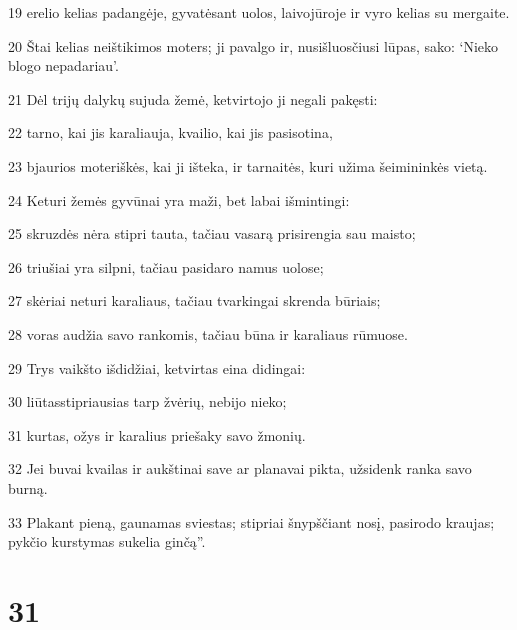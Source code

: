 \par 19 erelio kelias padangėje, gyvatės­ant uolos, laivo­jūroje ir vyro kelias su mergaite. 
\par 20 Štai kelias neištikimos moters; ji pavalgo ir, nusišluosčiusi lūpas, sako: ‘Nieko blogo nepadariau’. 
\par 21 Dėl trijų dalykų sujuda žemė, ketvirtojo ji negali pakęsti: 
\par 22 tarno, kai jis karaliauja, kvailio, kai jis pasisotina, 
\par 23 bjaurios moteriškės, kai ji išteka, ir tarnaitės, kuri užima šeimininkės vietą. 
\par 24 Keturi žemės gyvūnai yra maži, bet labai išmintingi: 
\par 25 skruzdės nėra stipri tauta, tačiau vasarą prisirengia sau maisto; 
\par 26 triušiai yra silpni, tačiau pasidaro namus uolose; 
\par 27 skėriai neturi karaliaus, tačiau tvarkingai skrenda būriais; 
\par 28 voras audžia savo rankomis, tačiau būna ir karaliaus rūmuose. 
\par 29 Trys vaikšto išdidžiai, ketvirtas eina didingai: 
\par 30 liūtas­stipriausias tarp žvėrių, nebijo nieko; 
\par 31 kurtas, ožys ir karalius priešaky savo žmonių. 
\par 32 Jei buvai kvailas ir aukštinai save ar planavai pikta, užsidenk ranka savo burną. 
\par 33 Plakant pieną, gaunamas sviestas; stipriai šnypščiant nosį, pasirodo kraujas; pykčio kurstymas sukelia ginčą”.



\chapter{31}



